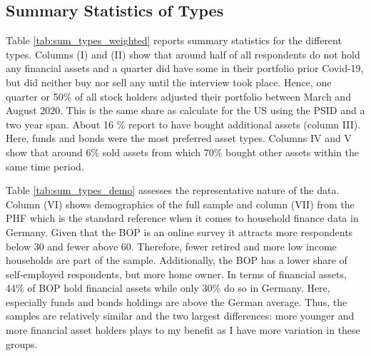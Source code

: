 \documentclass[ProjectABM]{subfiles}
\begin{document}
\subsection{Summary Statistics of Types}\label{sec:des_types}

Table \ref{tab:sum_types_weighted} reports summary statistics for the different types. Columns (I) and (II) show that around half of all respondents do not hold any financial assets and a quarter did have some in their portfolio prior Covid-19, but did neither buy nor sell any until the interview took place. Hence, one quarter or 50\% of all stock holders adjusted their portfolio between March and August 2020. This is the same share as \cite{bonaparte_et_al_2012adjustment} calculate for the US using the PSID and a two year span. %
About 16 \% report to have bought additional assets (column III). Here, funds and bonds were the most preferred asset types. Columns IV and V show that around 6\% sold assets from which 70\% bought other assets within the same time period. 



%



Table \ref{tab:sum_types_demo} assesses the representative nature of the data. Column (VI) shows demographics of the full sample and column (VII) from the PHF which is the standard reference when it comes to household finance data in Germany. Given that the BOP is an online survey it attracts more respondents below 30 and fewer above 60. Therefore, fewer retired and more low income households are part of the sample. Additionally, the BOP has a lower share of self-employed respondents, but more home owner. In terms of financial assets, 44\% of BOP hold financial assets while only 30\% do so in Germany. Here, especially funds and bonds holdings are above the German average. Thus, the samples are relatively similar and the two largest differences: more younger and more financial asset holders plays to my benefit as I have more variation in these groups.
\end{document}
